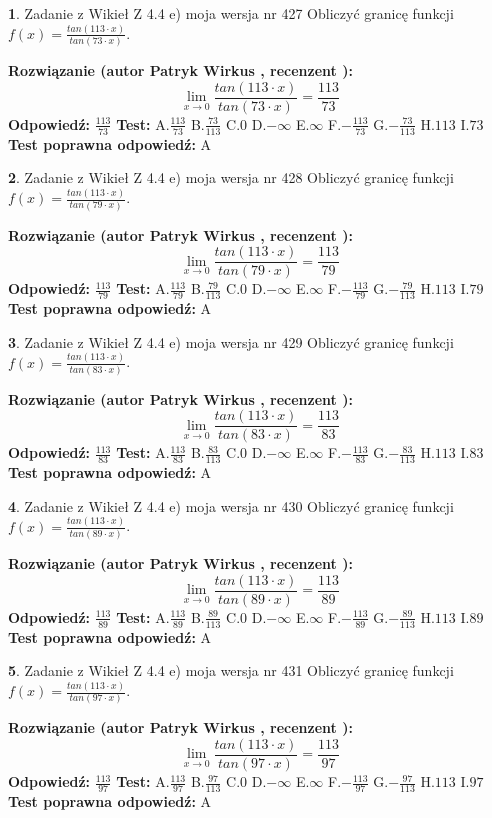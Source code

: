 \documentclass[12pt, a4paper]{article}
\theoremstyle{definition} %
\newtheorem{zad}{}
\newcommand{\zadStart}[1]{\begin{zad}#1\newline}
\newcommand{\zadStop}{\end{zad}}
\newcommand{\rozwStart}[2]{\noindent \textbf{Rozwiązanie (autor #1 , recenzent #2): }\newline}
\newcommand{\rozwStop}{\newline}
\newcommand{\odpStart}{\noindent \textbf{Odpowiedź:}\newline}
\newcommand{\odpStop}{\newline}
\newcommand{\testStart}{\noindent \textbf{Test:}\newline}
\newcommand{\testStop}{\newline}
\newcommand{\kluczStart}{\noindent \textbf{Test poprawna odpowiedź:}\newline}
\newcommand{\kluczStop}{\newline}
\begin{document}
\zadStart{Zadanie z Wikieł Z 4.4 e) moja wersja nr 427}
Obliczyć granicę funkcji $f(x)=\frac{tan(113\cdot x)}{tan(73\cdot x)}$.
\zadStop
\rozwStart{Patryk Wirkus}{}
$$\lim\limits_{x\to 0}\frac{tan(113\cdot x)}{tan(73\cdot x)}=
\frac{113}{73}$$
\rozwStop
\odpStart
$\frac{113}{73}$
\odpStop
\testStart
A.$\frac{113}{73}$
B.$\frac{73}{113}$
C.$0$
D.$-\infty$
E.$\infty$
F.$-\frac{113}{73}$
G.$-\frac{73}{113}$
H.$113$
I.$73$
\testStop
\kluczStart
A
\kluczStop



\zadStart{Zadanie z Wikieł Z 4.4 e) moja wersja nr 428}
Obliczyć granicę funkcji $f(x)=\frac{tan(113\cdot x)}{tan(79\cdot x)}$.
\zadStop
\rozwStart{Patryk Wirkus}{}
$$\lim\limits_{x\to 0}\frac{tan(113\cdot x)}{tan(79\cdot x)}=
\frac{113}{79}$$
\rozwStop
\odpStart
$\frac{113}{79}$
\odpStop
\testStart
A.$\frac{113}{79}$
B.$\frac{79}{113}$
C.$0$
D.$-\infty$
E.$\infty$
F.$-\frac{113}{79}$
G.$-\frac{79}{113}$
H.$113$
I.$79$
\testStop
\kluczStart
A
\kluczStop



\zadStart{Zadanie z Wikieł Z 4.4 e) moja wersja nr 429}
Obliczyć granicę funkcji $f(x)=\frac{tan(113\cdot x)}{tan(83\cdot x)}$.
\zadStop
\rozwStart{Patryk Wirkus}{}
$$\lim\limits_{x\to 0}\frac{tan(113\cdot x)}{tan(83\cdot x)}=
\frac{113}{83}$$
\rozwStop
\odpStart
$\frac{113}{83}$
\odpStop
\testStart
A.$\frac{113}{83}$
B.$\frac{83}{113}$
C.$0$
D.$-\infty$
E.$\infty$
F.$-\frac{113}{83}$
G.$-\frac{83}{113}$
H.$113$
I.$83$
\testStop
\kluczStart
A
\kluczStop



\zadStart{Zadanie z Wikieł Z 4.4 e) moja wersja nr 430}
Obliczyć granicę funkcji $f(x)=\frac{tan(113\cdot x)}{tan(89\cdot x)}$.
\zadStop
\rozwStart{Patryk Wirkus}{}
$$\lim\limits_{x\to 0}\frac{tan(113\cdot x)}{tan(89\cdot x)}=
\frac{113}{89}$$
\rozwStop
\odpStart
$\frac{113}{89}$
\odpStop
\testStart
A.$\frac{113}{89}$
B.$\frac{89}{113}$
C.$0$
D.$-\infty$
E.$\infty$
F.$-\frac{113}{89}$
G.$-\frac{89}{113}$
H.$113$
I.$89$
\testStop
\kluczStart
A
\kluczStop



\zadStart{Zadanie z Wikieł Z 4.4 e) moja wersja nr 431}
Obliczyć granicę funkcji $f(x)=\frac{tan(113\cdot x)}{tan(97\cdot x)}$.
\zadStop
\rozwStart{Patryk Wirkus}{}
$$\lim\limits_{x\to 0}\frac{tan(113\cdot x)}{tan(97\cdot x)}=
\frac{113}{97}$$
\rozwStop
\odpStart
$\frac{113}{97}$
\odpStop
\testStart
A.$\frac{113}{97}$
B.$\frac{97}{113}$
C.$0$
D.$-\infty$
E.$\infty$
F.$-\frac{113}{97}$
G.$-\frac{97}{113}$
H.$113$
I.$97$
\testStop
\kluczStart
A
\kluczStop
\end{document}

